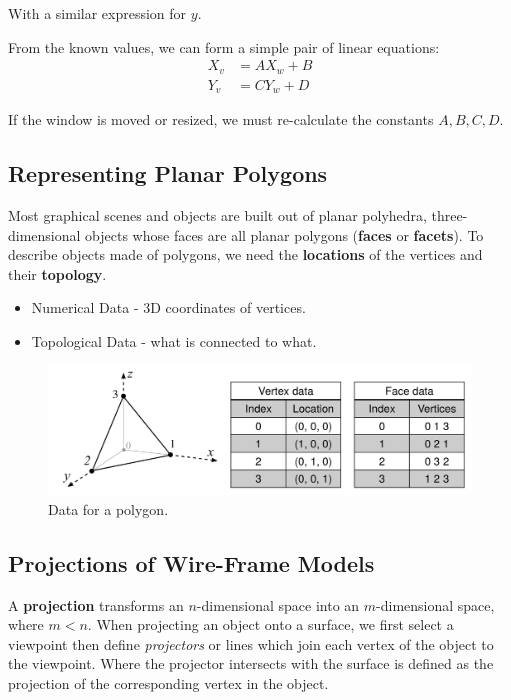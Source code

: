 \documentclass[11pt]{article}
\begin{document}
With a similar expression for $y$.

From the known values, we can form a simple pair of linear equations:
\begin{align*}
  X_v &= AX_w + B \\
  Y_v &= CY_w + D
\end{align*}

If the window is moved or resized, we must re-calculate the constants $A, B, C, D$.

\subsection{Representing Planar Polygons}
Most graphical scenes and objects are built out of planar polyhedra, three-dimensional objects whose faces are all planar polygons (\textbf{faces} or \textbf{facets}).
To describe objects made of polygons, we need the \textbf{locations} of the vertices and their \textbf{topology}.

\begin{itemize}
  \item Numerical Data - 3D coordinates of vertices.
  \item Topological Data - what is connected to what.
\end{itemize}

\begin{figure}[htb!]
  \caption{Data for a polygon.}
  \includegraphics[scale=0.3]{polygon}
  \centering
\end{figure}

\subsection{Projections of Wire-Frame Models}
A \textbf{projection} transforms an $n$-dimensional space into an $m$-dimensional space, where $m < n$.
When projecting an object onto a surface, we first select a viewpoint then define \textit{projectors} or lines which join each vertex of the object to the viewpoint.
Where the projector intersects with the surface is defined as the projection of the corresponding vertex in the object.
\end{document}
